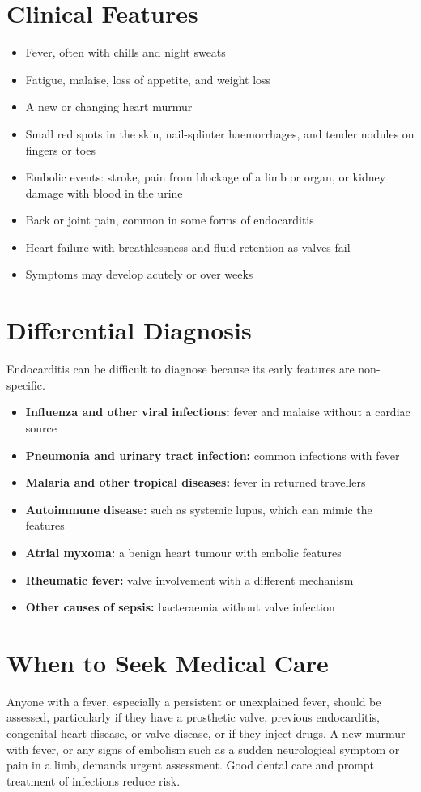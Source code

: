 \section*{Clinical Features}
\begin{itemize}
    \item Fever, often with chills and night sweats
    \item Fatigue, malaise, loss of appetite, and weight loss
    \item A new or changing heart murmur
    \item Small red spots in the skin, nail-splinter haemorrhages, and tender nodules on fingers or toes
    \item Embolic events: stroke, pain from blockage of a limb or organ, or kidney damage with blood in the urine
    \item Back or joint pain, common in some forms of endocarditis
    \item Heart failure with breathlessness and fluid retention as valves fail
    \item Symptoms may develop acutely or over weeks
\end{itemize}

\section*{Differential Diagnosis}
Endocarditis can be difficult to diagnose because its early features are non-specific.
\begin{itemize}
    \item \textbf{Influenza and other viral infections:} fever and malaise without a cardiac source
    \item \textbf{Pneumonia and urinary tract infection:} common infections with fever
    \item \textbf{Malaria and other tropical diseases:} fever in returned travellers
    \item \textbf{Autoimmune disease:} such as systemic lupus, which can mimic the features
    \item \textbf{Atrial myxoma:} a benign heart tumour with embolic features
    \item \textbf{Rheumatic fever:} valve involvement with a different mechanism
    \item \textbf{Other causes of sepsis:} bacteraemia without valve infection
\end{itemize}

\section*{When to Seek Medical Care}
Anyone with a fever, especially a persistent or unexplained fever, should be assessed, particularly if they have a prosthetic valve, previous endocarditis, congenital heart disease, or valve disease, or if they inject drugs. A new murmur with fever, or any signs of embolism such as a sudden neurological symptom or pain in a limb, demands urgent assessment. Good dental care and prompt treatment of infections reduce risk.

